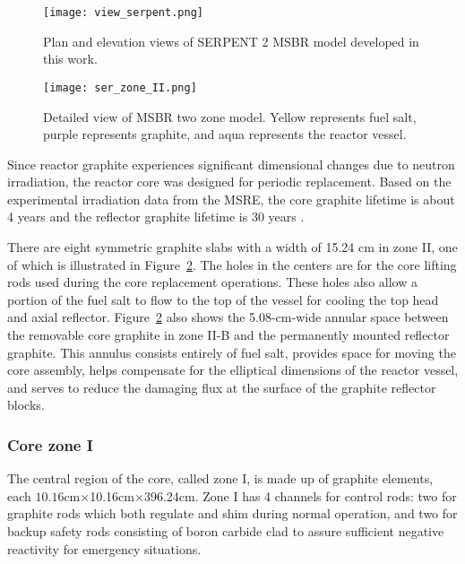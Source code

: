 \begin{figure}[hbp!] %
  \texttt{[image: view\_serpent.png]}
  \caption{Plan and elevation views of SERPENT 2 \gls{MSBR} model developed in 
  this work.}
  \label{fig:serpent_plan_view}
\end{figure}

\begin{figure}[t!] %
  \texttt{[image: ser\_zone\_II.png]}
  \caption{Detailed view of \gls{MSBR} two zone model. 
          Yellow represents fuel salt, purple represents graphite, and aqua represents the reactor vessel.}
  \label{fig:serpent_zoneII}
\end{figure}

Since reactor graphite experiences significant dimensional changes due to 
neutron irradiation, the reactor core was designed for periodic replacement. 
Based on the experimental irradiation data from the \gls{MSRE}, the core graphite 
lifetime is about 4 years and the reflector graphite lifetime is 30 years 
\cite{robertson_conceptual_1971}.

There are eight symmetric graphite slabs with a width of 15.24 cm in zone II, 
one of which is illustrated in Figure~\ref{fig:serpent_zoneII}. The holes in 
the centers are for the core lifting rods used during the core replacement 
operations. These holes also allow a portion of the fuel salt to flow to the 
top of the vessel for cooling the top head and axial reflector. 
Figure~\ref{fig:serpent_zoneII} also shows
the 5.08-cm-wide annular 
space between the removable core graphite in zone II-B and the permanently 
mounted reflector graphite. This annulus consists entirely of fuel salt, 
provides space for moving the core assembly, helps compensate for the elliptical 
dimensions of the reactor vessel, and serves to reduce the damaging flux at the 
surface of the graphite reflector blocks. 

\subsubsection{Core zone I}
The central region of the core, called zone I, is made up of graphite elements, 
each $10.16$cm$\times$10.16cm$\times$396.24cm. Zone I has 4 channels for 
control rods: two for graphite rods which both regulate and shim during normal 
operation, and two for backup safety rods consisting of boron carbide clad to 
assure sufficient negative reactivity for emergency situations.

